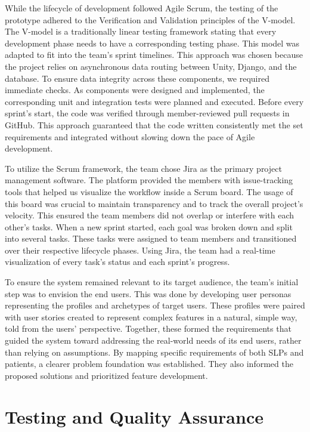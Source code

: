 While the lifecycle of development followed Agile Scrum, the testing of the prototype adhered to the Verification and Validation principles of the V-model. The V-model is a traditionally linear testing framework stating that every development phase needs to have a corresponding testing phase. This model was adapted to fit into the team's sprint timelines. This approach was chosen because the project relies on asynchronous data routing between Unity, Django, and the database. To ensure data integrity across these components, we required immediate checks. As components were designed and implemented, the corresponding unit and integration tests were planned and executed. Before every sprint's start, the code was verified through member-reviewed pull requests in GitHub. This approach guaranteed that the code written consistently met the set requirements and integrated without slowing down the pace of Agile development.

To utilize the Scrum framework, the team chose Jira as the primary project management software. The platform provided the members with issue-tracking tools that helped us visualize the workflow inside a Scrum board. The usage of this board was crucial to maintain transparency and to track the overall project's velocity. This ensured the team members did not overlap or interfere with each other's tasks. When a new sprint started, each goal was broken down and split into several tasks. These tasks were assigned to team members and transitioned over their respective lifecycle phases. Using Jira, the team had a real-time visualization of every task's status and each sprint's progress.

To ensure the system remained relevant to its target audience, the team's initial step was to envision the end users. This was done by developing user personas representing the profiles and archetypes of target users. These profiles were paired with user stories created to represent complex features in a natural, simple way, told from the users' perspective. Together, these formed the requirements that guided the system toward addressing the real-world needs of its end users, rather than relying on assumptions. By mapping specific requirements of both SLPs and patients, a clearer problem foundation was established. They also informed the proposed solutions and prioritized feature development.

\section{Testing and Quality Assurance}
\label{sec:testing-and-quality-assurance}

